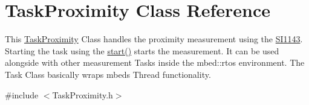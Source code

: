 \hypertarget{class_task_proximity}{}\section{Task\+Proximity Class Reference}
\label{class_task_proximity}


This \hyperlink{class_task_proximity}{Task\+Proximity} Class handles the proximity measurement using the \hyperlink{class_s_i1143}{S\+I1143}. Starting the task using the \hyperlink{class_task_proximity_a38eee2752705735bd33b621ea7bcca8b}{start()} starts the measurement. It can be used alongside with other measurement Tasks inside the mbed\+::rtos environment. The Task Class basically wraps mbeds Thread functionality.  




{\ttfamily \#include $<$Task\+Proximity.\+h$>$}

